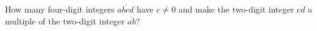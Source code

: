How many four-digit integers $\overline{abcd}$ have $c\ne0$ and make the two-digit integer $\overline{cd}$ a multiple of the two-digit integer $\overline{ab}$?
